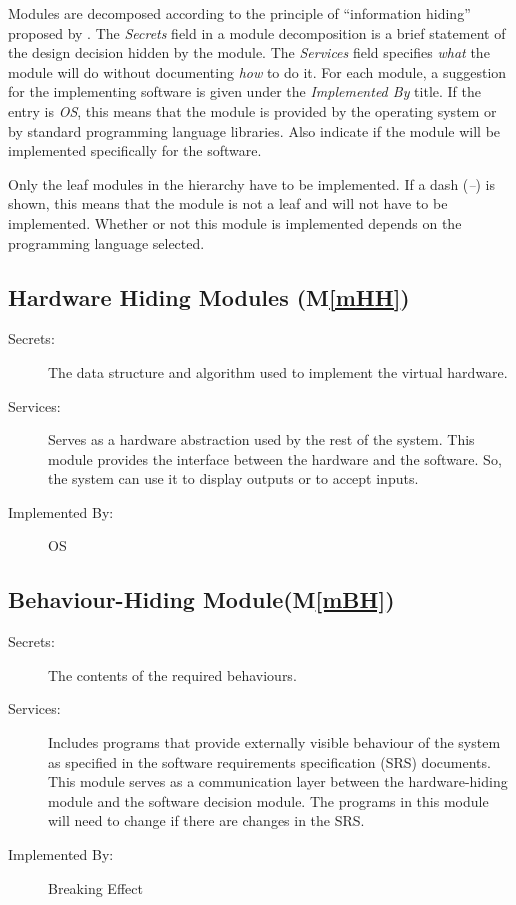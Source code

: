 \documentclass[12pt, titlepage]{article}
\newcommand{\mref}[1]{M\ref{#1}}
\begin{document}
	Modules are decomposed according to the principle of ``information hiding''
	proposed by \citet{ParnasEtAl1984}. The \emph{Secrets} field in a module
	decomposition is a brief statement of the design decision hidden by the
	module. The \emph{Services} field specifies \emph{what} the module will do
	without documenting \emph{how} to do it. For each module, a suggestion for the
	implementing software is given under the \emph{Implemented By} title. If the
	entry is \emph{OS}, this means that the module is provided by the operating
	system or by standard programming language libraries.  Also indicate if the
	module will be implemented specifically for the software.
	
	Only the leaf modules in the
	hierarchy have to be implemented. If a dash (\emph{--}) is shown, this means
	that the module is not a leaf and will not have to be implemented. Whether or
	not this module is implemented depends on the programming language
	selected.
	
	\subsection{Hardware Hiding Modules (\mref{mHH})}
	
	\begin{description}
		\item[Secrets:]The data structure and algorithm used to implement the virtual
		hardware.
		\item[Services:]Serves as a hardware abstraction used by the rest of the
		system. This module provides the interface between the hardware and the
		software. So, the system can use it to display outputs or to accept inputs.
		\item[Implemented By:] OS
	\end{description}
	
	\subsection{Behaviour-Hiding Module(\mref{mBH})}
	
	\begin{description}
		\item[Secrets:]The contents of the required behaviours.
		\item[Services:]Includes programs that provide externally visible behaviour of
		the system as specified in the software requirements specification (SRS)
		documents. This module serves as a communication layer between the
		hardware-hiding module and the software decision module. The programs in this
		module will need to change if there are changes in the SRS.
		\item[Implemented By:] Breaking Effect
	\end{description}
	
\end{document}
